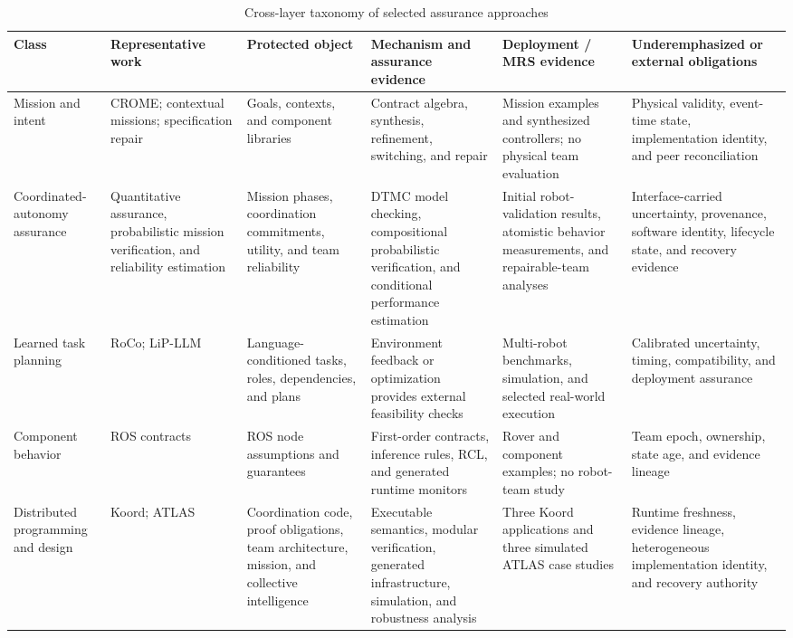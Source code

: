 \begin{table}[t]
  \centering
  \caption{Cross-layer taxonomy of selected assurance approaches}
  \label{tab:related-work}
  \scriptsize
  \setlength{\tabcolsep}{1.4pt}
  \renewcommand{\arraystretch}{1.03}
  \begin{tabularx}{\textwidth}{@{}P{0.105\textwidth}P{0.16\textwidth}P{0.14\textwidth}P{0.21\textwidth}P{0.16\textwidth}Y@{}}
    \toprule
    Class & Representative work & Protected object & Mechanism and assurance evidence & Deployment / MRS evidence & Underemphasized or external obligations \\
    \midrule
    Mission and intent & CROME; contextual missions; specification repair \cite{mallozzi2020crome,mallozzi2023contextual,mallozzi2022repair} & Goals, contexts, and component libraries & Contract algebra, synthesis, refinement, switching, and repair & Mission examples and synthesized controllers; no physical team evaluation & Physical validity, event-time state, implementation identity, and peer reconciliation \\
    Coordinated-autonomy assurance & Quantitative assurance, probabilistic mission verification, and reliability estimation \cite{chaki2013assurance,chaki2013probabilistic,porter2013reliability,stancliff2006missionreliability} & Mission phases, coordination commitments, utility, and team reliability & DTMC model checking, compositional probabilistic verification, and conditional performance estimation & Initial robot-validation results, atomistic behavior measurements, and repairable-team analyses & Interface-carried uncertainty, provenance, software identity, lifecycle state, and recovery evidence \\
    Learned task planning & RoCo; LiP-LLM \cite{mandi2023roco,obata2024lipllm} & Language-conditioned tasks, roles, dependencies, and plans & Environment feedback or optimization provides external feasibility checks & Multi-robot benchmarks, simulation, and selected real-world execution & Calibrated uncertainty, timing, compatibility, and deployment assurance \\
    Component behavior & ROS contracts \cite{luckcuck2026compositional} & ROS node assumptions and guarantees & First-order contracts, inference rules, RCL, and generated runtime monitors & Rover and component examples; no robot-team study & Team epoch, ownership, state age, and evidence lineage \\
    Distributed programming and design & Koord; ATLAS \cite{ghosh2020koord,harbin2023design} & Coordination code, proof obligations, team architecture, mission, and collective intelligence & Executable semantics, modular verification, generated infrastructure, simulation, and robustness analysis & Three Koord applications and three simulated ATLAS case studies & Runtime freshness, evidence lineage, heterogeneous implementation identity, and recovery authority \\

\end{tabularx}
\end{table}
